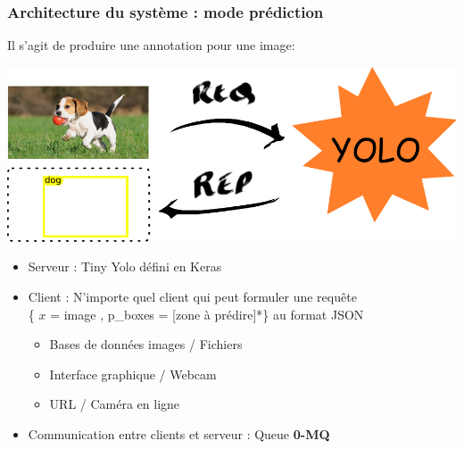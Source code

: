 \documentclass[11pt]{beamer}
\begin{document}
\begin{frame}
\frametitle{Architecture du système : mode prédiction}
Il s'agit de produire une annotation pour une image:
\begin{center}
\includegraphics[keepaspectratio=true,height=0.25\textheight]{images/archi_predict.pdf}
\end{center}
\pause
\begin{itemize}
\item Serveur : Tiny Yolo défini en Keras
\pause
\item Client : N'importe quel client qui peut formuler une requête\\ \{ $x$ = image , p\_boxes = [zone à prédire]*\}  au format JSON
\begin{itemize}
\item Bases de données images / Fichiers
\item Interface graphique / Webcam
\item URL / Caméra en ligne
\end{itemize}
\pause
\item Communication entre clients et serveur : Queue \textbf{0-MQ}
\end{itemize}
\end{frame}
\end{document}
